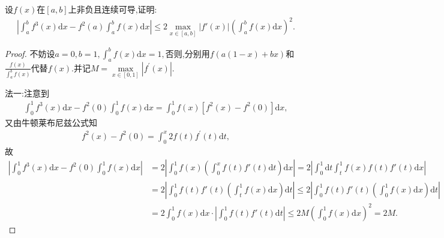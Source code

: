 \documentclass[../../main.tex]{subfiles}%
\begin{document}
\begin{example}
设$f(x)$在$[a,b]$上非负且连续可导,证明:
\begin{align*}
\left| \int_a^b f^3(x) \mathrm{d}x - f^2(a) \int_a^b f(x) \mathrm{d}x \right| \leqslant 2 \max\limits_{x\in[a,b]} |f'(x)| \left( \int_a^b f(x) \mathrm{d}x \right)^2.
\end{align*}
\end{example}
\begin{proof}
不妨设$a=0,b=1,\int_a^b{f\left( x \right)}\mathrm{d}x=1,$否则,分别用$f\left( a\left( 1-x \right) +bx \right)$和$\frac{f\left( x \right)}{\int_a^b{f\left( x \right)}}$代替$f\left( x \right).$并记$M=\max\limits_{x\in \left[ 0,1 \right]}\left| f^\prime \left( x \right) \right|.$

{\color{blue}法一:}注意到
\begin{align*}
\int_0^1{f^3\left( x \right) \mathrm{d}x}-f^2\left( 0 \right) \int_0^1{f\left( x \right) \mathrm{d}x}=\int_0^1{f\left( x \right) \left[ f^2\left( x \right) -f^2\left( 0 \right) \right] \mathrm{d}x},
\end{align*}
又由牛顿莱布尼兹公式知
\begin{align*}
f^2\left( x \right) -f^2\left( 0 \right) =\int_0^x{2f\left( t \right) f^\prime \left( t \right) \mathrm{d}t},
\end{align*}
故
\begin{align*}
\left| \int_0^1{f^3\left( x \right) \mathrm{d}x}-f^2\left( 0 \right) \int_0^1{f\left( x \right) \mathrm{d}x} \right|&=2\left| \int_0^1{f\left( x \right) \left( \int_0^x{f\left( t \right) f' \left( t \right) \mathrm{d}t} \right) \mathrm{d}x} \right|=2\left| \int_0^1{\mathrm{d}t\int_t^1{f\left( x \right) f\left( t \right) f' \left( t \right)}\mathrm{d}x} \right|
\\
&=2\left| \int_0^1{f\left( t \right) f' \left( t \right) \left( \int_t^1{f\left( x \right)}\mathrm{d}x \right) \mathrm{d}t} \right|\leqslant 2\left| \int_0^1{f\left( t \right) f' \left( t \right) \left( \int_0^1{f\left( x \right)}\mathrm{d}x \right) \mathrm{d}t} \right|
\\
&=2\int_0^1{f\left( x \right)}\mathrm{d}x\cdot \left| \int_0^1{f\left( t \right) f' \left( t \right) \mathrm{d}t} \right|\leqslant 2M\left( \int_0^1{f\left( x \right)}\mathrm{d}x \right) ^2=2M.
\end{align*}


\end{proof}
\end{document}
